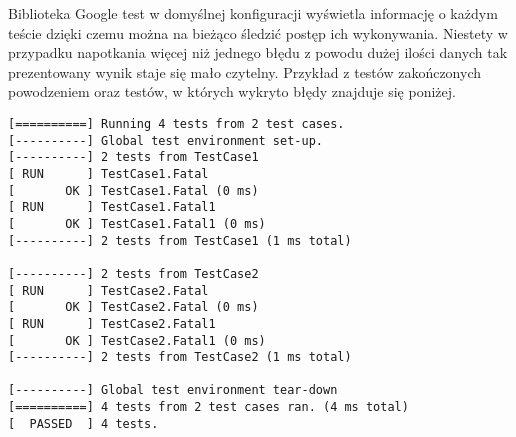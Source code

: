 \documentclass[12pt,a4paper,notitlepage]{report}
\begin{document}
Biblioteka Google test w domyślnej konfiguracji wyświetla informację o każdym teście dzięki czemu można na bieżąco śledzić postęp ich wykonywania. Niestety w przypadku napotkania więcej niż jednego błędu z powodu dużej ilości danych tak prezentowany wynik staje się mało czytelny. Przykład z testów zakończonych powodzeniem oraz testów, w których wykryto błędy znajduje się poniżej.

		\begin{lstlisting}[label=some-code,caption=Przykłądowy pozytywny wynik testu w bibliotece Google test]
[==========] Running 4 tests from 2 test cases.
[----------] Global test environment set-up.
[----------] 2 tests from TestCase1
[ RUN      ] TestCase1.Fatal
[       OK ] TestCase1.Fatal (0 ms)
[ RUN      ] TestCase1.Fatal1
[       OK ] TestCase1.Fatal1 (0 ms)
[----------] 2 tests from TestCase1 (1 ms total)

[----------] 2 tests from TestCase2
[ RUN      ] TestCase2.Fatal
[       OK ] TestCase2.Fatal (0 ms)
[ RUN      ] TestCase2.Fatal1
[       OK ] TestCase2.Fatal1 (0 ms)
[----------] 2 tests from TestCase2 (1 ms total)

[----------] Global test environment tear-down
[==========] 4 tests from 2 test cases ran. (4 ms total)
[  PASSED  ] 4 tests.
		\end{lstlisting}
\end{document}
